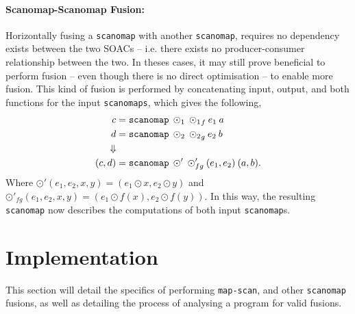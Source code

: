 \documentclass[11pt,bibliography=totocnumbered]{article}
\begin{document}
\paragraph{Scanomap-Scanomap Fusion:} Horizontally fusing a \texttt{scanomap} with another \texttt{scanomap}, requires no dependency exists between the
 two SOACs -- i.e. there exists no producer-consumer relationship between the two. In theses cases, it may still prove beneficial to perform fusion -- even though there is no direct
 optimisation -- to enable more fusion.
This kind of fusion is performed by concatenating input, output, and both functions for the input \texttt{scanomaps}, which gives the following,
\begin{align*}
  c &= \mathtt{scanomap} \: \odot_1 \: {\odot_1}_f \: e_1 \: a \\
  d &= \mathtt{scanomap} \: \odot_2 \: {\odot_2}_g \: e_2 \: b \\
\Downarrow \\
  (c,d) &= \mathtt{scanomap} \: \odot' \: \odot'_{fg} \: (e_1, e_2) \: (a, b)\mathnormal{.}
\end{align*}
Where $\odot'(e_1,e_2, x, y) = (e_1 \odot x, e_2 \odot y)$ and $\odot'_{fg}(e_1, e_2, x, y) = (e_1 \odot f(x), e_2 \odot f(y))$. In this way, the resulting \texttt{scanomap}
 now describes the computations of both input \texttt{scanomap}s.
\section{Implementation}\label{sec:imp}
This section will detail the specifics of performing \texttt{map-scan}, and other \texttt{scanomap} fusions, as well as detailing the process of
analysing a program for valid fusions.
\end{document}
